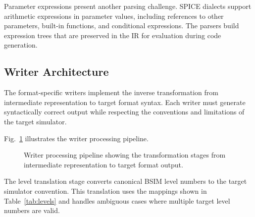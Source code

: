 \documentclass[conference]{IEEEtran}
\begin{document}
Parameter expressions present another parsing challenge. SPICE dialects support arithmetic expressions in parameter values, including references to other parameters, built-in functions, and conditional expressions. The parsers build expression trees that are preserved in the IR for evaluation during code generation.

\subsection{Writer Architecture}

The format-specific writers implement the inverse transformation from intermediate representation to target format syntax. Each writer must generate syntactically correct output while respecting the conventions and limitations of the target simulator.

Fig.~\ref{fig:writer_pipeline} illustrates the writer processing pipeline.

\begin{figure}[htbp]
\centering
{}
\caption{Writer processing pipeline showing the transformation stages from intermediate representation to target format output.}
\label{fig:writer_pipeline}
\end{figure}

The level translation stage converts canonical BSIM level numbers to the target simulator convention. This translation uses the mappings shown in Table~\ref{tab:levels} and handles ambiguous cases where multiple target level numbers are valid.
\end{document}
